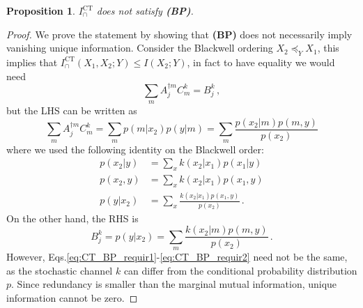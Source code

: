 \documentclass{article}
\newcommand{\BP}{\textbf{(BP)}\xspace} %
\newcommand{\ICT}{\ensuremath{I_\cap^{\text{CT}}}\xspace}
\newcommand{\ICTs}{\ensuremath{I_\cap^{\text{CT}}(X_1,X_2;Y)}\xspace}
\newtheorem{proposition}{Proposition}
\begin{document}
\begin{proposition} \label{prop:CT-BP}
    $\ICT$ does not satisfy \BP.
\end{proposition}
\begin{proof}
    We prove the statement by showing that \BP does not necessarily imply vanishing unique information. Consider the Blackwell ordering $X_2\preceq_Y X_1$, this implies that $\ICTs\leq I(X_2;Y)$, in fact to have equality we would need 
    \begin{equation} \label{eq:CT_BP_casc}
        \sum_m A_j^{\dagger m} C^k_m = B^k_j \,,
    \end{equation}
    but the LHS can be written as 
    \begin{equation} \label{eq:CT_BP_requir1}
        \sum_m A_j^{\dagger m} C^k_m = \sum_m p(m|x_2)p(y|m) = \sum_m \frac{p(x_2|m)p(m,y)}{p(x_2)} 
    \end{equation}
    where we used the following identity on the Blackwell order:
    \begin{equation} \label{eq:BP_rewriting}
    \begin{aligned}
        p(x_2|y) & = \sum_x k(x_2|x_1) p(x_1|y) \\
        p(x_2,y) & = \sum_x k(x_2|x_1) p(x_1,y) \\
        p(y|x_2) & = \sum_x \frac{k(x_2|x_1) p(x_1,y)}{p(x_2)} \,.
    \end{aligned}
    \end{equation}
    On the other hand, the RHS is 
    \begin{equation} \label{eq:CT_BP_requir2}
        B^k_j = p(y|x_2) = \sum_m \frac{k(x_2|m)p(m,y)}{p(x_2)} \,.
    \end{equation}
    However, Eqs.\eqref{eq:CT_BP_requir1}-\eqref{eq:CT_BP_requir2} need not be the same, as the stochastic channel $k$ can differ from the conditional probability distribution $p$.
    Since redundancy is smaller than the marginal mutual information, unique information cannot be zero.
\end{proof}
\end{document}
